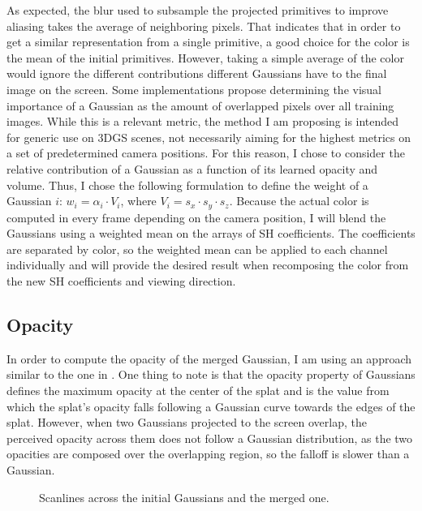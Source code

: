 As expected, the blur used to subsample the projected primitives to improve aliasing takes the average of neighboring pixels. That indicates that in order to get a similar representation from a single primitive, a good choice for the color is the mean of the initial primitives. However, taking a simple average of the color would ignore the different contributions different Gaussians have to the final image on the screen. Some implementations propose determining the visual importance of a Gaussian as the amount of overlapped pixels over all training images. While this is a relevant metric, the method I am proposing is intended for generic use on 3DGS scenes, not necessarily aiming for the highest metrics on a set of predetermined camera positions. For this reason, I chose to consider the relative contribution of a Gaussian as a function of its learned opacity and volume. Thus, I chose the following formulation to define the weight of a Gaussian $i$: $w_i = \alpha_i \cdot V_i$, where $V_i = s_x\cdot s_y \cdot s_z$. Because the actual color is computed in every frame depending on the camera position, I will blend the Gaussians using a weighted mean on the arrays of SH coefficients. The coefficients are separated by color, so the weighted mean can be applied to each channel individually and will provide the desired result when recomposing the color from the new SH coefficients and viewing direction. 

\subsection{Opacity}
In order to compute the opacity of the merged Gaussian, I am using an approach similar to the one in \cite{kerbl_hierarchy}. One thing to note is that the opacity property of Gaussians defines the maximum opacity at the center of the splat and is the value from which the splat's opacity falls following a Gaussian curve towards the edges of the splat. However, when two Gaussians projected to the screen overlap, the perceived opacity across them does not follow a Gaussian distribution, as the two opacities are composed over the overlapping region, so the falloff is slower than a Gaussian. 

\begin{wrapfigure}{r}{5.5cm}
    \centering
    
    \caption{Scanlines across the initial Gaussians and the merged one.}
    \label{fig:blendfig}
\end{wrapfigure}


